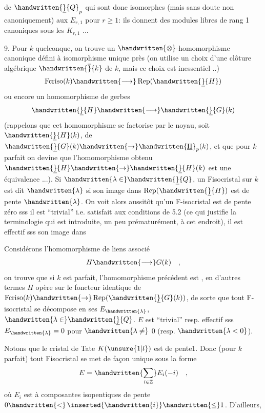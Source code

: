 de $\handwritten{\underline}{Q}_p$ \handwritten{)} qui sont donc isomorphes  (mais sans doute non canoniquement) aux $E_{r,1}$ pour $r\geq1$: ils donnent des modules libres de rang 1 canoniques sous les $K_{r,1}$ ...\handwritten{]}

9. Pour $k$ quelconque, on trouve un  $\handwritten{\otimes}$-homomorphisme canonique  défini à isomorphisme unique près (on utilise un choix d'une clôture algébrique $\handwritten{\overline}{k}$ de $k$, mais ce choix est inessentiel ..)
\[
\operatorname{Fcriso}(k)\handwritten{\longrightarrow}\operatorname{Rep}(\handwritten{\underline}{H})
\]
ou encore un homomorphisme de gerbes
\[
\handwritten{\underline}{H}\handwritten{\longrightarrow}\handwritten{\underline}{G}(k)
\]
(rappelons que cet homomorphisme se factorise par le noyau, soit  $\handwritten{\underline}{H}(k)$, de $\handwritten{\underline}{G}(k)\handwritten{\to}\handwritten{\underline{\Pi}}_p(k)$, et que pour $k$ parfait on devine que l'homomorphisme obtenu $\handwritten{\underline}{H}\handwritten{\to}\handwritten{\underline}{H}(k)$ est une équivalence ...). Si $\handwritten{\lambda\in}\handwritten{\underline}{Q}$, un F\deleted{(}\handwritten{-}isocristal sur $k$ est dit   $\handwritten{\lambda}$ si son image dans $\operatorname{Rep}(\handwritten{\underline}{H})$ est de pente $\handwritten{\lambda}$. On voit alors aussitôt qu'un F-isocristal est de pente zéro sss il est ``trivial'' i.e. satisfait aux conditions de 5.2 (ce qui justifie la terminologie qui est introduite, un peu prématurément, à cet endroit), il est effectif sss son image dans 

Considérons l'homomorphisme de liens associé
\[
H\handwritten{\longrightarrow}G(k)\quad ,
\]
on trouve  que si $k$ est parfait, l'homomorphisme précédent est , en d'autres termes $H$ opère sur le foncteur identique de $\operatorname{Fcriso}(k)\handwritten{\to}\operatorname{Rep}(\handwritten{\underline}{G}(k))$, de sorte que tout F-isocristal  se décompose en ses  $E_{\handwritten{\lambda}}$, $\handwritten{\lambda\in}\handwritten{\underline}{Q}$. $E$ est ``trivial'' resp. effectif sss $E_{\handwritten{\lambda}}=0$ pour $\handwritten{\lambda\ne}$ 0 (resp. $\handwritten{\lambda<0}$).

Notons que le cristal de Tate $K(\unsure{1|l})$ est de pente\handwritten{-}1. Donc (pour $k$ parfait) tout F\deleted{(}\handwritten{-}isocristal se met de façon unique sous la forme
\[
E=\handwritten{\sum_{i\in\mathbb{Z}}}E_i(-i)\quad ,
\]
où $E_i$ est à composantes isopentiques de pente $0\handwritten{<}\,\inserted{\handwritten{i}}\handwritten{\leq}1$. D'ailleurs,
